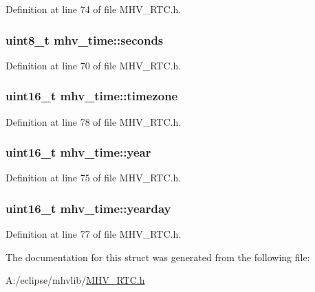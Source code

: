 \-Definition at line 74 of file \-M\-H\-V\-\_\-\-R\-T\-C.\-h.

\hypertarget{structmhv__time_a4844293af0a3648391fb9335f2aa758c}{
\subsubsection[{seconds}]{\setlength{\rightskip}{0pt plus 5cm}uint8\-\_\-t {\bf mhv\-\_\-time\-::seconds}}}
\label{structmhv__time_a4844293af0a3648391fb9335f2aa758c}


\-Definition at line 70 of file \-M\-H\-V\-\_\-\-R\-T\-C.\-h.

\hypertarget{structmhv__time_abe9ad1b2bfd43e6688c07367a279c50b}{
\subsubsection[{timezone}]{\setlength{\rightskip}{0pt plus 5cm}uint16\-\_\-t {\bf mhv\-\_\-time\-::timezone}}}
\label{structmhv__time_abe9ad1b2bfd43e6688c07367a279c50b}


\-Definition at line 78 of file \-M\-H\-V\-\_\-\-R\-T\-C.\-h.

\hypertarget{structmhv__time_ab5441551ca64fde709afdc98fa5c851e}{
\subsubsection[{year}]{\setlength{\rightskip}{0pt plus 5cm}uint16\-\_\-t {\bf mhv\-\_\-time\-::year}}}
\label{structmhv__time_ab5441551ca64fde709afdc98fa5c851e}


\-Definition at line 75 of file \-M\-H\-V\-\_\-\-R\-T\-C.\-h.

\hypertarget{structmhv__time_aa5e9d8969550c007c40f6b2dd404d3d6}{
\subsubsection[{yearday}]{\setlength{\rightskip}{0pt plus 5cm}uint16\-\_\-t {\bf mhv\-\_\-time\-::yearday}}}
\label{structmhv__time_aa5e9d8969550c007c40f6b2dd404d3d6}


\-Definition at line 77 of file \-M\-H\-V\-\_\-\-R\-T\-C.\-h.



\-The documentation for this struct was generated from the following file\-:\begin{DoxyCompactItemize}
\item 
\-A\-:/eclipse/mhvlib/\hyperlink{_m_h_v___r_t_c_8h}{\-M\-H\-V\-\_\-\-R\-T\-C.\-h}\end{DoxyCompactItemize}
